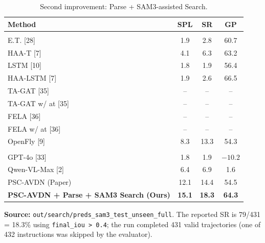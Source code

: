 \documentclass[11pt]{article}
\begin{document}
\begin{table}[ht]
\centering
\caption{Second improvement: Parse + SAM3-assisted Search.}
\renewcommand{\arraystretch}{1.16}
\setlength{\tabcolsep}{5.5pt}
\begin{tabular}{L{5.0cm}ccc}
\toprule
\textbf{Method} & \textbf{SPL} & \textbf{SR} & \textbf{GP} \\
\midrule
{} \\
E.T. [28] & 1.9 & 2.8 & 60.7 \\
HAA-T [7] & 4.1 & 6.3 & 63.2 \\
LSTM [10] & 1.8 & 1.9 & 56.4 \\
HAA-LSTM [7] & 1.9 & 2.6 & 66.5 \\
TA-GAT [35] & -- & -- & -- \\
TA-GAT w/ at [35] & -- & -- & -- \\
FELA [36] & -- & -- & -- \\
FELA w/ at [36] & -- & -- & -- \\
OpenFly [9] & 8.3 & 13.3 & 54.3 \\
\midrule
{} \\
GPT-4o [33] & 1.8 & 1.9 & $-10.2$ \\
Qwen-VL-Max [2] & 6.4 & 6.9 & 1.6 \\
PSC-AVDN (Paper) & 12.1 & 14.4 & 54.5 \\
\textbf{PSC-AVDN + Parse + SAM3 Search (Ours)} & \textbf{15.1} & \textbf{18.3} & \textbf{64.3} \\
\bottomrule
\end{tabular}
\end{table}

\vfill
\noindent\textbf{Source:} \texttt{out/search/preds\_sam3\_test\_unseen\_full}. The reported SR is 79/431 = 18.3\% using \texttt{final\_iou > 0.4}; the run completed 431 valid trajectories (one of 432 instructions was skipped by the evaluator).
\end{document}
